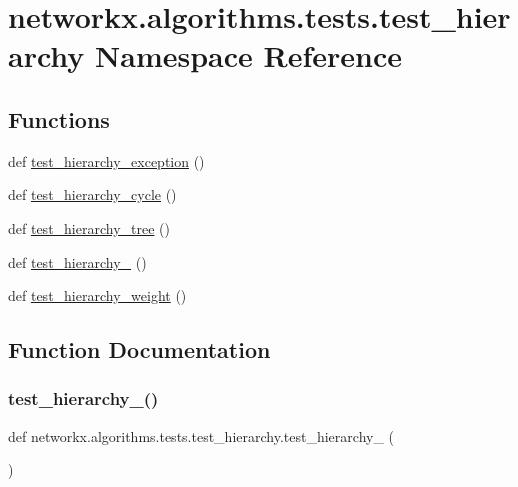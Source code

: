 \hypertarget{namespacenetworkx_1_1algorithms_1_1tests_1_1test__hierarchy}{}\section{networkx.\+algorithms.\+tests.\+test\+\_\+hierarchy Namespace Reference}
\label{namespacenetworkx_1_1algorithms_1_1tests_1_1test__hierarchy}
\subsection*{Functions}
\begin{DoxyCompactItemize}
\item 
def \hyperlink{namespacenetworkx_1_1algorithms_1_1tests_1_1test__hierarchy_ac065a909ce7c585fab02f1fa54e265e4}{test\+\_\+hierarchy\+\_\+exception} ()
\item 
def \hyperlink{namespacenetworkx_1_1algorithms_1_1tests_1_1test__hierarchy_a96b775ff4e17e9a4c1eb5f16c1df5425}{test\+\_\+hierarchy\+\_\+cycle} ()
\item 
def \hyperlink{namespacenetworkx_1_1algorithms_1_1tests_1_1test__hierarchy_a36c8099a98184f801f52f3e091d351b8}{test\+\_\+hierarchy\+\_\+tree} ()
\item 
def \hyperlink{namespacenetworkx_1_1algorithms_1_1tests_1_1test__hierarchy_ad388a3993203fa05ab2f9b372fbb4301}{test\+\_\+hierarchy\+\_} ()
\item 
def \hyperlink{namespacenetworkx_1_1algorithms_1_1tests_1_1test__hierarchy_a9458972047c93ed308772ffb18fa63bb}{test\+\_\+hierarchy\+\_\+weight} ()
\end{DoxyCompactItemize}


\subsection{Function Documentation}
\mbox{\label{namespacenetworkx_1_1algorithms_1_1tests_1_1test__hierarchy_ad388a3993203fa05ab2f9b372fbb4301}} 
\subsubsection{\texorpdfstring{test\+\_\+hierarchy\+\_()}{test\_hierarchy\_1()}}
{\footnotesize\ttfamily def networkx.\+algorithms.\+tests.\+test\+\_\+hierarchy.\+test\+\_\+hierarchy\+\_ (\begin{DoxyParamCaption}{ }\end{DoxyParamCaption})}

